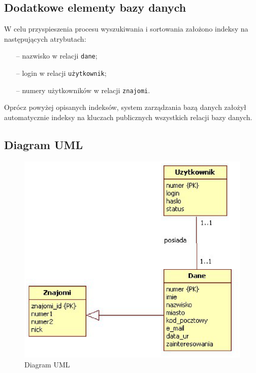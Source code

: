 \documentclass[a4paper,12pt]{article}
\begin{document}
\subsection[Dodatkowe elementy bazy danych]{Dodatkowe elementy bazy danych}
W celu przyspieszenia procesu wyszukiwania i sortowania założono indeksy na następujących atrybutach:
\begin{itemize}
    \item[--] nazwisko w relacji \texttt{dane};
    \item[--] login w relacji \texttt{użytkownik};
    \item[--] numery użytkowników w relacji \texttt{znajomi}.
\end{itemize}
Oprócz powyżej opisanych indeksów, system zarządzania bazą danych założył automatycznie indeksy na kluczach publicznych
wszystkich relacji bazy danych.

\subsection[Diagram UML]{Diagram UML}
\begin{center}
	\begin{figure}[!hbp]
	  \caption{Diagram UML}
	    \label{fig:Diagram}
	      \begin{center}
	        \includegraphics[scale=0.55]{Model.eps}
	      \end{center}
    \end{figure}
\end{center}
\end{document}
